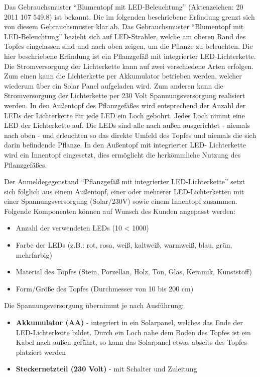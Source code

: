 \documentclass[ngerman, 12pt, a4paper]{scrartcl}
\begin{document}
Das Gebrauchsmuster ``Blumentopf mit LED-Beleuchtung'' (Aktenzeichen: 20 2011 107 549.8) ist bekannt.
Die im folgenden beschriebene Erfindung grenzt sich von diesem Gebrauchsmuster klar ab. Das
Gebrauchsmuster ``Blumentopf mit LED-Beleuchtung'' bezieht sich auf LED-Strahler, welche am oberen
Rand des Topfes eingelassen sind und nach oben zeigen, um die Pflanze zu beleuchten.
Die hier beschriebene Erfindung ist ein Pflanzgefäß mit integrierter LED-Lichterkette. Die
Stromversorgung der Lichterkette kann auf zwei verschiedene Arten erfolgen. Zum einen kann die
Lichterkette per Akkumulator betrieben werden, welcher wiederum über ein Solar Panel aufgeladen
wird. Zum anderen kann die Stromversorgung der Lichterkette per 230 Volt Spannungsversorgung
realisiert werden. In den Außentopf des Pflanzgefäßes wird entsprechend der Anzahl der LEDs der
Lichterkette für jede LED ein Loch gebohrt. Jedes Loch nimmt eine LED der Lichterkette auf. Die
LEDs sind alle nach außen ausgerichtet - niemals nach oben - und erleuchten so das direkte Umfeld
des Topfes und niemals die sich darin befindende Pflanze. In den Außentopf mit integrierter LED-
Lichterkette wird ein Innentopf eingesetzt, dies ermöglicht die herkömmliche Nutzung des Pflanzgefäßes.\newline

Der Anmeldegegenstand ``Pflanzgefäß mit integrierter LED-Lichterkette'' setzt sich folglich aus
einem Außentopf, einer oder mehrerer LED-Lichterketten mit einer Spannungsversorgung (Solar/230V)
sowie einem Innentopf zusammen. Folgende Komponenten können auf Wunsch des Kunden angepasst werden:
\begin{itemize}
\item Anzahl der verwendeten LEDs (10 < 1000)
\item Farbe der LEDs (z.B.: rot, rosa, weiß, kaltweiß, warmweiß, blau, grün, mehrfarbig)
\item Material des Topfes (Stein, Porzellan, Holz, Ton, Glas, Keramik, Kunststoff)
\item Form/Größe des Topfes (Durchmesser von 10 bis 200 cm)
\end{itemize}

Die Spannungsversorgung übernimmt je nach Ausführung:
\begin{itemize}
\item \textbf{Akkumulator (AA)} - integriert in ein Solarpanel, welches das Ende der
LED-Lichterkette bildet. Durch ein Loch nahe dem Boden des Topfes ist ein Kabel nach außen geführt,
so kann das Solarpanel etwas abseits des Topfes platziert werden
\item \textbf{Steckernetzteil (230 Volt)} -  mit Schalter und Zuleitung
\end{itemize}
\end{document}
